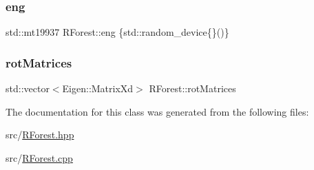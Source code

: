 \subsubsection{\texorpdfstring{eng}{eng}}
{\footnotesize\ttfamily std\+::mt19937 R\+Forest\+::eng \{std\+::random\+\_\+device\{\}()\}\hspace{0.3cm}{\ttfamily [private]}}

\mbox{\label{classRForest_a2b03a249697e9a68362455a6be8b1762}} 
\subsubsection{\texorpdfstring{rot\+Matrices}{rotMatrices}}
{\footnotesize\ttfamily std\+::vector$<$Eigen\+::\+Matrix\+Xd$>$ R\+Forest\+::rot\+Matrices\hspace{0.3cm}{\ttfamily [private]}}



The documentation for this class was generated from the following files\+:\begin{DoxyCompactItemize}
\item 
src/\hyperlink{RForest_8hpp}{R\+Forest.\+hpp}\item 
src/\hyperlink{RForest_8cpp}{R\+Forest.\+cpp}\end{DoxyCompactItemize}
